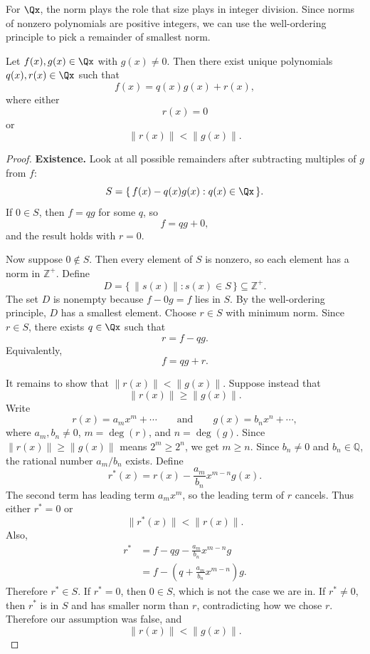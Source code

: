 For $\Qx$, the norm plays the role that size plays in integer division.  Since norms of nonzero
polynomials are positive integers, we can use the well-ordering principle to
pick a remainder of smallest norm.

\begin{theorem}
Let $f(x),g(x)\in\Qx$ with $g(x)\neq0$.  Then there exist unique
polynomials $q(x),r(x)\in\Qx$ such that
\[
f(x)=q(x)g(x)+r(x),
\]
where either
\[
r(x)=0
\]
or
\[
\|r(x)\|<\|g(x)\|.
\]
\end{theorem}

\begin{proof}
\textbf{Existence.}
Look at all possible remainders after subtracting multiples of $g$ from $f$:
\[
S=\{\,f(x)-q(x)g(x):q(x)\in\Qx\,\}.
\]
If $0\in S$, then $f=qg$ for some $q$, so
\[
f=qg+0,
\]
and the result holds with $r=0$.

Now suppose $0\notin S$.  Then every element of $S$ is nonzero, so
each element has a norm in $\mathbb{Z}^+$.  Define
\[
D=\{\,\|s(x)\|:s(x)\in S\,\}\subseteq\mathbb{Z}^+.
\]
The set $D$ is nonempty because $f-0g=f$ lies in $S$.  By the well-ordering
principle, $D$ has a smallest element.  Choose $r\in S$ with minimum norm.
Since $r\in S$, there exists $q\in\Qx$ such that
\[
r=f-qg.
\]
Equivalently,
\[
f=qg+r.
\]

It remains to show that $\|r(x)\|<\|g(x)\|$.  Suppose instead that
\[
\|r(x)\|\geq\|g(x)\|.
\]
Write
\[
r(x)=a_mx^m+\cdots
\qquad\text{and}\qquad
g(x)=b_nx^n+\cdots,
\]
where $a_m,b_n\neq0$, $m=\deg(r)$, and $n=\deg(g)$.  Since
$\|r(x)\|\geq\|g(x)\|$ means $2^m\geq2^n$, we get $m\geq n$.  Since $b_n\neq0$
and $b_n\in\mathbb{Q}$, the rational number $a_m/b_n$ exists.  Define
\[
r^*(x)=r(x)-\frac{a_m}{b_n}x^{m-n}g(x).
\]
The second term has leading term $a_mx^m$, so the leading term of $r$ cancels.
Thus either $r^*=0$ or
\[
\|r^*(x)\|<\|r(x)\|.
\]
Also,
\[
\begin{aligned}
r^*
&=f-qg-\frac{a_m}{b_n}x^{m-n}g\\
&=f-\left(q+\frac{a_m}{b_n}x^{m-n}\right)g.
\end{aligned}
\]
Therefore $r^*\in S$.  If $r^*=0$, then $0\in S$, which is not the case we are
in.  If $r^*\neq0$, then $r^*$ is in $S$ and has smaller norm than $r$,
contradicting how we chose $r$.  Therefore our assumption was false, and
\[
\|r(x)\|<\|g(x)\|.
\]


\end{proof}
